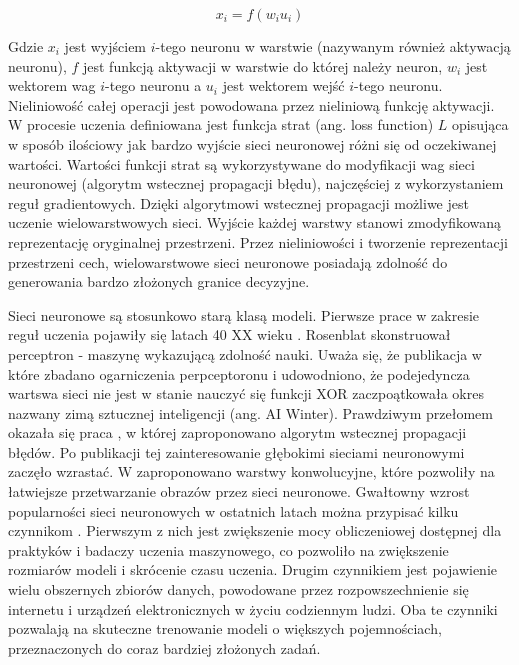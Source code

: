 \documentclass[oneside, mag]{mgr}
\begin{document}
\begin{equation}
	x_i = f(w_i u_i)
\end{equation}

Gdzie $x_i$ jest wyjściem $i$-tego neuronu w warstwie (nazywanym również aktywacją neuronu), $f$ jest funkcją aktywacji w warstwie do której należy neuron, $w_i$ jest wektorem wag $i$-tego neuronu a $u_i$ jest wektorem wejść $i$-tego neuronu. Nieliniowość całej operacji jest powodowana przez nieliniową funkcję aktywacji. W procesie uczenia definiowana jest funkcja strat (ang. loss function) $L$ opisująca w sposób ilościowy jak bardzo wyjście sieci neuronowej różni się od oczekiwanej wartości. Wartości funkcji strat są wykorzystywane do modyfikacji wag sieci neuronowej (algorytm wstecznej propagacji błędu), najczęściej z wykorzystaniem reguł gradientowych. Dzięki algorytmowi wstecznej propagacji możliwe jest uczenie wielowarstwowych sieci. Wyjście każdej warstwy stanowi zmodyfikowaną reprezentację oryginalnej przestrzeni. Przez nieliniowości i tworzenie reprezentacji przestrzeni cech, wielowarstwowe sieci neuronowe posiadają zdolność do generowania bardzo złożonych granice decyzyjne.

Sieci neuronowe są stosunkowo starą klasą modeli. Pierwsze prace w zakresie reguł uczenia pojawiły się latach 40 XX wieku \cite{McCulloch-Pitts} \cite{Hebb}. Rosenblat \cite{Rosenblatt} skonstruował perceptron - maszynę wykazującą zdolność nauki. Uważa się, że publikacja w które zbadano ogarniczenia perpceptoronu i udowodniono, że podejedyncza wartswa sieci nie jest w stanie nauczyć się funkcji XOR \cite{Perceptrons} zaczpoątkowała okres nazwany zimą sztucznej inteligencji (ang. AI Winter). Prawdziwym przełomem okazała się praca \cite{Rumelhart}, w której zaproponowano algorytm wstecznej propagacji błędów. Po publikacji tej zainteresowanie głębokimi sieciami neuronowymi zaczęło wzrastać. W \cite{Conv} zaproponowano warstwy konwolucyjne, które pozwoliły na łatwiejsze przetwarzanie obrazów przez sieci neuronowe. 
Gwałtowny wzrost popularności sieci neuronowych w ostatnich latach można przypisać kilku czynnikom \cite{Goodfellow-et-al-2016}. Pierwszym z nich jest zwiększenie mocy obliczeniowej dostępnej dla praktyków i badaczy uczenia maszynowego, co pozwoliło na zwiększenie rozmiarów modeli i skrócenie czasu uczenia. Drugim czynnikiem jest pojawienie wielu obszernych zbiorów danych, powodowane przez rozpowszechnienie się internetu i urządzeń elektronicznych w życiu codziennym ludzi. Oba te czynniki pozwalają na skuteczne trenowanie modeli o większych pojemnościach, przeznaczonych do coraz bardziej złożonych zadań.
\end{document}
